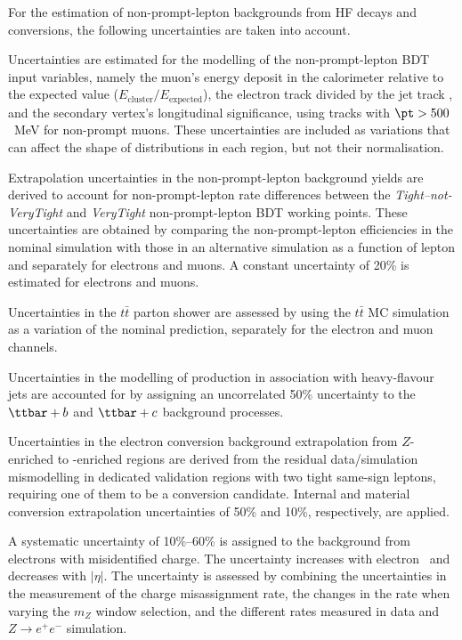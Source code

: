 \documentclass[cernpreprint, atlasdraft=false, texlive=2023, UKenglish, texmf, orcidlogo]{atlasdoc}
\begin{document}
For the estimation of non-prompt-lepton backgrounds from HF decays and
conversions, the following uncertainties are taken into account.
 
Uncertainties are estimated for the modelling of the non-prompt-lepton BDT input variables,
namely the muon's energy deposit in the calorimeter relative to the expected value
($E_\mathrm{cluster}/E_\mathrm{expected}$), the electron track \pt
divided by the jet track \pt, and the secondary vertex's longitudinal significance, using tracks with $\pt > 500$~MeV for non-prompt muons.
These uncertainties are included as variations that can affect the shape of distributions in each region, but not their normalisation.
 
Extrapolation uncertainties in the non-prompt-lepton background yields are
derived to account for non-prompt-lepton rate differences between the
\textit{Tight--not-VeryTight} and \textit{VeryTight} non-prompt-lepton BDT working points.
These uncertainties are obtained by comparing the non-prompt-lepton
efficiencies in the nominal \ttbar simulation with those in an alternative
\ttbar simulation as a function of lepton \pt and separately for
electrons and muons.
A constant uncertainty of 20\% is estimated for electrons and muons.
 
Uncertainties in the $t\bar{t}$ parton shower are assessed by using the
\POWHER[7] $t\bar{t}$ MC simulation as a variation of the nominal
\POWPY[8] prediction, separately for the electron and muon channels.
 
Uncertainties in the modelling of \ttbar production in association
with heavy-flavour jets are accounted for by assigning an uncorrelated
50\% uncertainty to the $\ttbar+b$ and $\ttbar+c$ background
processes.
 
Uncertainties in the electron conversion background extrapolation from
$Z$-enriched to \ttbar-enriched regions are derived from the
residual data/simulation mismodelling in
dedicated \ll validation regions with two tight same-sign leptons,
requiring one of them to be a conversion candidate.
Internal and material conversion extrapolation
uncertainties of 50\% and 10\%, respectively, are applied.
 
A systematic uncertainty of 10\%--60\% is assigned to the background
from electrons with misidentified charge. The uncertainty increases
with electron \pt\ and decreases with $|\eta|$. The uncertainty is
assessed by combining the uncertainties in the measurement of the
charge misassignment rate, the changes in the rate when varying the
$m_Z$ window selection, and the different rates measured in data and
$Z\rightarrow e^+e^-$ simulation.
 
\end{document}
